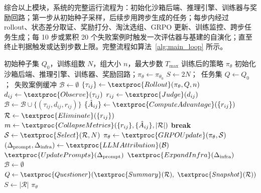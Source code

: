 综合以上模块，系统的完整运行流程为：初始化沙箱后端、推理引擎、训练器与奖励回路；第一步从初始种子采样，后续步用跨步生成的任务；每步内经过 rollout、状态差分取证、奖励打分、淘汰选组、GRPO 更新、训练监控、跨步任务生成；每 10 步或累积 20 个失败案例时触发一次评估器与基建的自演化；直至终止判据触发或达到步数上限。完整流程如算法~\ref{alg:main_loop} 所示。

\begin{algorithm}[htbp]
\caption{自进化强化学习主循环（含失败案例自演化）}
\label{alg:main_loop}
\begin{algorithmic}[1]
\Require 初始种子集 $Q_0$，训练组数 $N$，组大小 $n$，最大步数 $T_{\max}$
\Ensure 训练后的策略 $\pi_\theta$
\State 初始化沙箱后端、推理引擎、训练器、奖励回路；$\pi_\theta \gets \pi_{\theta_0}$
\State $S \gets 2N$；\ 任务集 $Q \gets Q_0$；\ 失败案例缓冲 $\mathcal{B} \gets \emptyset$ 
    \State $\{\tau_{ij}\} \gets \textproc{Rollout}(\pi_\theta, Q, n)$ 
        \State $d_{ij} \gets \textproc{Observe}(\tau_{ij})$ 
        \State $r_{ij} \gets \textproc{Judge}(d_{ij})$ 
         
            \State $\mathcal{B} \gets \mathcal{B} \cup \{(\tau_{ij}, d_{ij}, r_{ij})\}$ 
        \EndIf
    \EndFor
    \State $\{\hat{A}_{ij}\} \gets \textproc{ComputeAdvantage}(\{r_{ij}\})$ 
    \State $\mathcal{R} \gets \textproc{Eliminate}(\{r_{ij}\})$ 
    \State $m \gets \textproc{CollapseMetrics}(\{r_{ij}\}, \{\hat{A}_{ij}\}, |\mathcal{R}|)$ 
     
        \State \textbf{break}
    \EndIf
    \State $\mathcal{S} \gets \textproc{Select}(\mathcal{R}, N)$ 
    \State $\pi_\theta \gets \textproc{GRPOUpdate}(\pi_\theta, \mathcal{S})$ 
     
        \State $(\Delta_{\text{prompt}}, \Delta_{\text{infra}}) \gets \textproc{LLMAttribution}(\mathcal{B})$ 
        \State $\textproc{UpdatePrompts}(\Delta_{\text{prompt}})$ 
        \State $\textproc{ExpandInfra}(\Delta_{\text{infra}})$ 
        \State $\mathcal{B} \gets \emptyset$ 
    \EndIf
    \State $Q \gets \textproc{Questioner}(\textproc{Summary}(\mathcal{R}),\ \textproc{Snapshot}(\mathcal{R}))$ 
    \State $S \gets |\mathcal{R}|$ 
\EndFor
\State \Return $\pi_\theta$
\end{algorithmic}
\end{algorithm}

